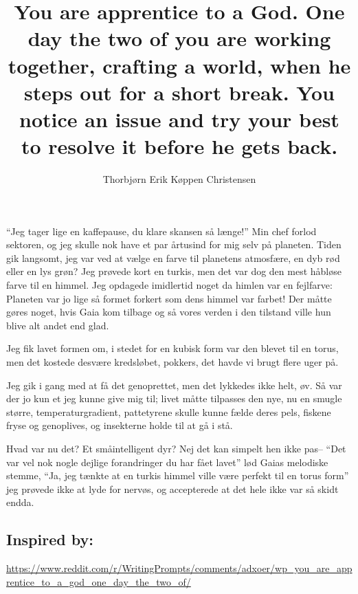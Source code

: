 \documentclass[oneside,danish,onecolumn,openbib,a4paper]{memoir}
\title{You are apprentice to a God. One day the two of you are working together, crafting a world, when he steps out for a short break. You notice an issue and try your best to resolve it before he gets back.}
\author{Thorbjørn Erik Køppen Christensen}
\begin{document}
\maketitle{}

``Jeg tager lige en kaffepause, du klare skansen så længe!'' Min chef forlod sektoren, og jeg skulle nok have et par årtusind for mig selv på planeten.
Tiden gik langsomt, jeg var ved at vælge en farve til planetens atmosfære, en dyb rød eller en lys grøn? Jeg prøvede kort en turkis, men det var dog den mest håbløse farve til en himmel. 
Jeg opdagede imidlertid noget da himlen var en fejlfarve: Planeten var jo lige så formet forkert som dens himmel var farbet!
Der måtte gøres  noget, hvis Gaia kom tilbage og så vores verden i den tilstand ville hun blive alt andet end glad.

Jeg fik lavet formen om, i stedet for en kubisk form var den blevet til en torus, men det kostede desvære kredsløbet, pokkers, det havde vi brugt flere uger på.

Jeg gik i gang med at få det genoprettet, men det lykkedes ikke helt, øv. 
Så var der jo kun et jeg kunne give mig til; livet måtte tilpasses den nye, nu en smugle større, temperaturgradient, pattetyrene skulle kunne fælde deres pels, fiskene fryse og genoplives, og insekterne holde til at gå i stå. 

Hvad var nu det? Et småintelligent dyr? Nej det kan simpelt hen ikke pas-- ``Det var vel nok nogle dejlige forandringer du har fået lavet'' lød Gaias melodiske stemme, ``Ja, jeg tænkte at en turkis himmel ville være perfekt til en torus form'' jeg prøvede ikke at lyde for nervøs, og accepterede at det hele ikke var så skidt endda.
\newline\newline\newline
\subsection{Inspired by:}
\url{https://www.reddit.com/r/WritingPrompts/comments/adxoer/wp_you_are_apprentice_to_a_god_one_day_the_two_of/}
\end{document}
